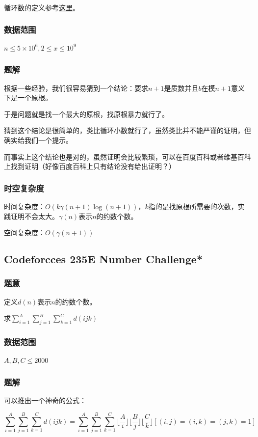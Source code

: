 \documentclass{ctexart}
\begin{document}
循环数的定义参考\href{http://baike.baidu.com/link?url=1COaQ6sINJa3g0niAGVT8RuhAj44MBxTeWETymOCfYweN5KYMq_wDEZsmuxxnz63-ZnIN9wKHj0XQfqXWfJ3Ba}{这里}。
\subsubsection{数据范围}
$n \le 5 \times 10^6,2 \le x \le 10^9$
\subsubsection{题解}
根据一些经验，我们很容易猜到一个结论：要求$n+1$是质数并且$b$在模$n+1$意义下是一个原根。

于是问题就是找一个最大的原根，找原根暴力就行了。

猜到这个结论是很简单的，类比循环小数就行了，虽然类比并不能严谨的证明，但确实给我们一个提示。

而事实上这个结论也是对的，虽然证明会比较繁琐，可以在百度百科或者维基百科上找到证明（好像百度百科上只有结论没有给出证明？）
\subsubsection{时空复杂度}
时间复杂度：$O(k\gamma(n+1)\log (n+1))$，$k$指的是找原根所需要的次数，实践证明不会太大。$\gamma(n)$表示$n$的约数个数。

空间复杂度：$O(\gamma(n+1))$
\subsection{Codeforcces 235E Number Challenge*}
\subsubsection{题意}
定义$d(n)$表示$n$的约数个数。

求$\sum\limits_{i=1}^A \sum\limits_{j=1}^B \sum\limits_{k=1}^C d(ijk)$
\subsubsection{数据范围}
$A,B,C \le 2000$
\subsubsection{题解}
可以推出一个神奇的公式：

\begin{displaymath}
\sum_{i=1}^A \sum_{j=1}^B \sum_{k=1}^C d(ijk)=\sum_{i=1}^A \sum_{j=1}^B \sum_{k=1}^C \lfloor \frac{A}{i} \rfloor \lfloor \frac{B}{j} \rfloor \lfloor \frac{C}{k} \rfloor [(i,j)=(i,k)=(j,k)=1]
\end{displaymath}
\end{document}
